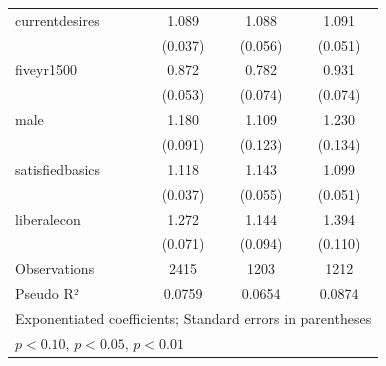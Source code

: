 \begin{table}[htbp]
\begin{tabular}{l*{3}{c}}
\addlinespace
currentdesires&       1.089\sym{**} &       1.088         &       1.091\sym{*}  \\
            &     (0.037)         &     (0.056)         &     (0.051)         \\
\addlinespace
fiveyr1500  &       0.872\sym{**} &       0.782\sym{***}&       0.931         \\
            &     (0.053)         &     (0.074)         &     (0.074)         \\
\addlinespace
male        &       1.180\sym{**} &       1.109         &       1.230\sym{*}  \\
            &     (0.091)         &     (0.123)         &     (0.134)         \\
\addlinespace
satisfiedbasics&       1.118\sym{***}&       1.143\sym{***}&       1.099\sym{**} \\
            &     (0.037)         &     (0.055)         &     (0.051)         \\
\addlinespace
liberalecon &       1.272\sym{***}&       1.144\sym{*}  &       1.394\sym{***}\\
            &     (0.071)         &     (0.094)         &     (0.110)         \\
\midrule
Observations&        2415         &        1203         &        1212         \\
Pseudo R²  &      0.0759         &      0.0654         &      0.0874         \\
\bottomrule
\multicolumn{4}{l}{\footnotesize Exponentiated coefficients; Standard errors in parentheses}\\
\multicolumn{4}{l}{\footnotesize \sym{*} \(p<0.10\), \sym{**} \(p<0.05\), \sym{***} \(p<0.01\)}\\
\end{tabular}
\end{table}
